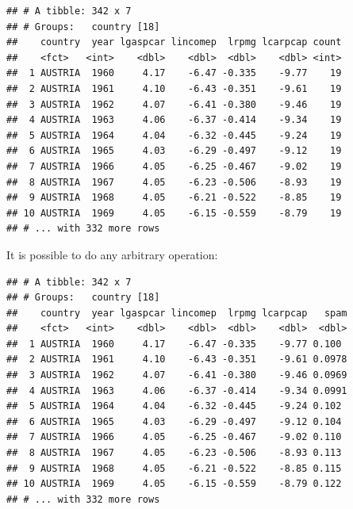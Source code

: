 \documentclass[]{gitbook}
\newenvironment{Shaded}{\begin{snugshade}}{\end{snugshade}}
\newcommand{\DataTypeTok}[1]{\textcolor[rgb]{0.13,0.29,0.53}{#1}}
\newcommand{\KeywordTok}[1]{\textcolor[rgb]{0.13,0.29,0.53}{\textbf{#1}}}
\newcommand{\NormalTok}[1]{#1}
\newcommand{\OperatorTok}[1]{\textcolor[rgb]{0.81,0.36,0.00}{\textbf{#1}}}
\newcommand{\StringTok}[1]{\textcolor[rgb]{0.31,0.60,0.02}{#1}}
\theoremstyle{definition}
\theoremstyle{definition}
\theoremstyle{definition}
\theoremstyle{remark}
\begin{document}
\begin{Shaded}
\end{Shaded}

\begin{verbatim}
## # A tibble: 342 x 7
## # Groups:   country [18]
##    country  year lgaspcar lincomep  lrpmg lcarpcap count
##    <fct>   <int>    <dbl>    <dbl>  <dbl>    <dbl> <int>
##  1 AUSTRIA  1960     4.17    -6.47 -0.335    -9.77    19
##  2 AUSTRIA  1961     4.10    -6.43 -0.351    -9.61    19
##  3 AUSTRIA  1962     4.07    -6.41 -0.380    -9.46    19
##  4 AUSTRIA  1963     4.06    -6.37 -0.414    -9.34    19
##  5 AUSTRIA  1964     4.04    -6.32 -0.445    -9.24    19
##  6 AUSTRIA  1965     4.03    -6.29 -0.497    -9.12    19
##  7 AUSTRIA  1966     4.05    -6.25 -0.467    -9.02    19
##  8 AUSTRIA  1967     4.05    -6.23 -0.506    -8.93    19
##  9 AUSTRIA  1968     4.05    -6.21 -0.522    -8.85    19
## 10 AUSTRIA  1969     4.05    -6.15 -0.559    -8.79    19
## # ... with 332 more rows
\end{verbatim}

It is possible to do any arbitrary operation:

\begin{Shaded}
\end{Shaded}

\begin{verbatim}
## # A tibble: 342 x 7
## # Groups:   country [18]
##    country  year lgaspcar lincomep  lrpmg lcarpcap   spam
##    <fct>   <int>    <dbl>    <dbl>  <dbl>    <dbl>  <dbl>
##  1 AUSTRIA  1960     4.17    -6.47 -0.335    -9.77 0.100 
##  2 AUSTRIA  1961     4.10    -6.43 -0.351    -9.61 0.0978
##  3 AUSTRIA  1962     4.07    -6.41 -0.380    -9.46 0.0969
##  4 AUSTRIA  1963     4.06    -6.37 -0.414    -9.34 0.0991
##  5 AUSTRIA  1964     4.04    -6.32 -0.445    -9.24 0.102 
##  6 AUSTRIA  1965     4.03    -6.29 -0.497    -9.12 0.104 
##  7 AUSTRIA  1966     4.05    -6.25 -0.467    -9.02 0.110 
##  8 AUSTRIA  1967     4.05    -6.23 -0.506    -8.93 0.113 
##  9 AUSTRIA  1968     4.05    -6.21 -0.522    -8.85 0.115 
## 10 AUSTRIA  1969     4.05    -6.15 -0.559    -8.79 0.122 
## # ... with 332 more rows
\end{verbatim}
\end{document}

